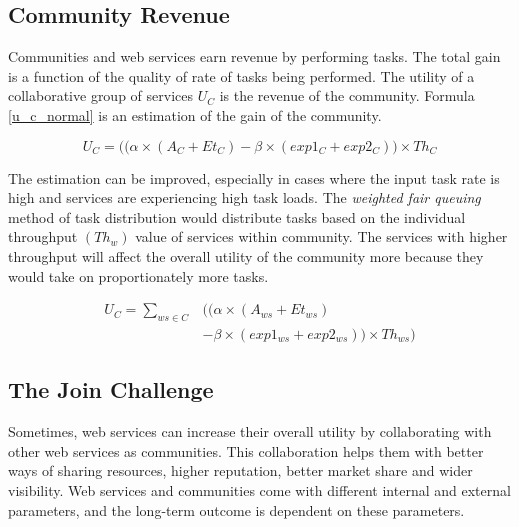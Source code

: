 \documentclass[10pt,journal,cspaper,compsoc]{IEEEtran}
\begin{document}
\subsection{Community Revenue}

Communities and web services earn revenue by performing tasks. The total gain is a function of the quality of rate of tasks being performed. The utility of a collaborative group of services $U_{C}$ is the revenue of the community. Formula \ref{u_c_normal} is an estimation of the gain of the community.

\begin{equation}\label{u_c_normal}
U_{C} = \big((\alpha \times (A_{C} + Et_{C}) - \beta \times (exp1_{C} + exp2_{C})\big) \times Th_{C}
\end{equation}

The estimation can be improved, especially in cases where the input task rate is high and services are experiencing high task loads. The \emph{weighted fair queuing} method of task distribution would distribute tasks based on the individual throughput $(Th_{w})$ value of services within community. The services with higher throughput will affect the overall utility of the community more because they would take on proportionately more tasks.

\begin{equation}\label{u_c_load}
\begin{split}
U_{C} = \sum_{ws \in C}&\bigg(\big(\alpha \times (A_{ws} + Et_{ws}) \\
        & - \beta \times (exp1_{ws} + exp2_{ws})\big) \times Th_{ws}\bigg)
\end{split}
\end{equation}

\subsection{The Join Challenge}\label{s:tjc}
Sometimes, web services can increase their overall utility by collaborating with other web services as communities. This collaboration helps them with better ways of sharing resources, higher reputation, better market share and wider visibility. Web services and communities come with different internal and external parameters, and the long-term outcome is dependent on these parameters. 
\end{document}

